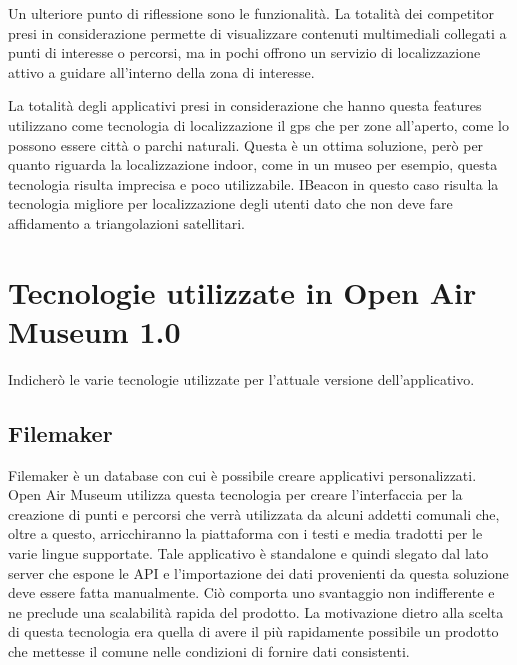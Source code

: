 Un ulteriore punto di riflessione sono le funzionalità. La totalità dei competitor presi in considerazione permette di visualizzare contenuti multimediali collegati a punti di interesse o percorsi, ma in pochi offrono un servizio di localizzazione attivo a guidare all’interno della zona di interesse.\vspace{5mm}

La totalità degli applicativi presi in considerazione che hanno questa features utilizzano come tecnologia di localizzazione il gps che per zone all’aperto, come lo possono essere città o parchi naturali. Questa è un ottima soluzione, però per quanto riguarda la localizzazione indoor, come in un museo per esempio, questa tecnologia risulta imprecisa e poco utilizzabile. IBeacon in questo caso risulta la tecnologia migliore per localizzazione degli utenti dato che non deve fare affidamento a triangolazioni satellitari.\vspace{5mm}

\section{Tecnologie utilizzate in Open Air Museum 1.0}\vspace{5mm}

Indicherò le varie tecnologie utilizzate per l'attuale versione dell'applicativo.\vspace{5mm}

\subsection{Filemaker}\vspace{5mm}

Filemaker è un database con cui è possibile creare applicativi personalizzati. Open Air Museum utilizza questa tecnologia per creare l’interfaccia per la creazione di punti e percorsi che verrà utilizzata da alcuni addetti comunali che, oltre a questo, arricchiranno la piattaforma con i testi e media tradotti per le varie lingue supportate. Tale applicativo è standalone e quindi slegato dal lato server che espone le API e l’importazione dei dati provenienti da questa soluzione deve essere fatta manualmente. Ciò comporta uno svantaggio non indifferente e ne preclude una scalabilità rapida del prodotto. La motivazione dietro alla scelta di questa tecnologia era quella di avere il più rapidamente possibile un prodotto che mettesse il comune nelle condizioni di fornire dati consistenti.\vspace{5mm}

